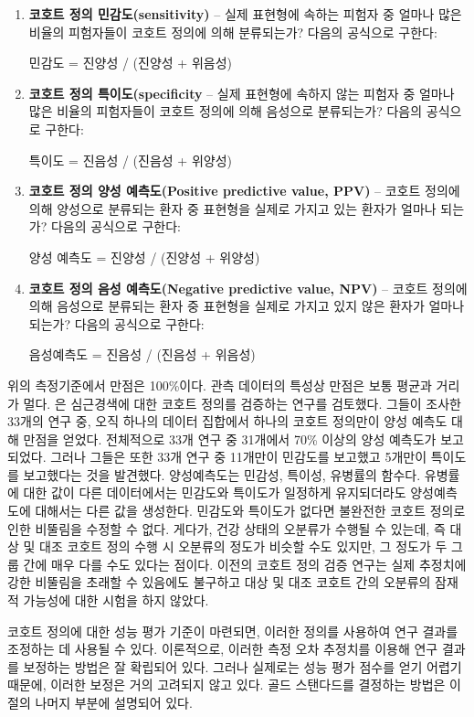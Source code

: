 \documentclass[11pt]{book}
\theoremstyle{definition}
\theoremstyle{definition}
\theoremstyle{definition}
\theoremstyle{remark}
\begin{document}
\begin{enumerate}
\def\labelenumi{\arabic{enumi}.}
\item
  \textbf{코호트 정의 민감도(sensitivity)} -- 실제 표현형에 속하는
  피험자 중 얼마나 많은 비율의 피험자들이 코호트 정의에 의해 분류되는가?
  다음의 공식으로 구한다:

  민감도 = 진양성 / (진양성 + 위음성)
\item
  \textbf{코호트 정의 특이도(specificity} -- 실제 표현형에 속하지 않는
  피험자 중 얼마나 많은 비율의 피험자들이 코호트 정의에 의해 음성으로
  분류되는가? 다음의 공식으로 구한다:

  특이도 = 진음성 / (진음성 + 위양성)
\item
  \textbf{코호트 정의 양성 예측도(Positive predictive value, PPV)} --
  코호트 정의에 의해 양성으로 분류되는 환자 중 표현형을 실제로 가지고
  있는 환자가 얼마나 되는가? 다음의 공식으로 구한다:

  양성 예측도 = 진양성 / (진양성 + 위양성)
\item
  \textbf{코호트 정의 음성 예측도(Negative predictive value, NPV)} --
  코호트 정의에 의해 음성으로 분류되는 환자 중 표현형을 실제로 가지고
  있지 않은 환자가 얼마나 되는가? 다음의 공식으로 구한다:

  음성예측도 = 진음성 / (진음성 + 위음성)
\end{enumerate}

위의 측정기준에서 만점은 100\%이다. 관측 데이터의 특성상 만점은 보통
평균과 거리가 멀다. \citet{Rubbo2015phenotypes} 은 심근경색에 대한
코호트 정의를 검증하는 연구를 검토했다. 그들이 조사한 33개의 연구 중,
오직 하나의 데이터 집합에서 하나의 코호트 정의만이 양성 예측도 대해
만점을 얻었다. 전체적으로 33개 연구 중 31개에서 70\% 이상의 양성
예측도가 보고되었다. 그러나 그들은 또한 33개 연구 중 11개만이 민감도를
보고했고 5개만이 특이도를 보고했다는 것을 발견했다. 양성예측도는 민감성,
특이성, 유병률의 함수다. 유병률에 대한 값이 다른 데이터에서는 민감도와
특이도가 일정하게 유지되더라도 양성예측도에 대해서는 다른 값을 생성한다.
민감도와 특이도가 없다면 불완전한 코호트 정의로 인한 비뚤림을 수정할 수
없다. 게다가, 건강 상태의 오분류가 수행될 수 있는데, 즉 대상 및 대조
코호트 정의 수행 시 오분류의 정도가 비슷할 수도 있지만, 그 정도가 두
그룹 간에 매우 다를 수도 있다는 점이다. 이전의 코호트 정의 검증 연구는
실제 추정치에 강한 비뚤림을 초래할 수 있음에도 불구하고 대상 및 대조
코호트 간의 오분류의 잠재적 가능성에 대한 시험을 하지 않았다.

코호트 정의에 대한 성능 평가 기준이 마련되면, 이러한 정의를 사용하여
연구 결과를 조정하는 데 사용될 수 있다. 이론적으로, 이러한 측정 오차
추정치를 이용해 연구 결과를 보정하는 방법은 잘 확립되어 있다. 그러나
실제로는 성능 평가 점수를 얻기 어렵기 때문에, 이러한 보정은 거의
고려되지 않고 있다. 골드 스탠다드를 결정하는 방법은 이 절의 나머지
부분에 설명되어 있다.
\end{document}
